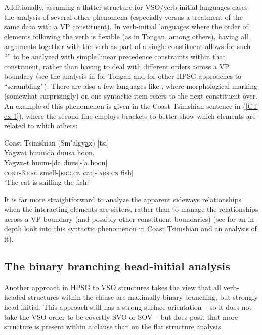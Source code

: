 \documentclass[output=paper
                ,modfonts
                ,nonflat
	        ,collection
	        ,collectionchapter
	        ,collectiontoclongg
 	        ,biblatex
                ,babelshorthands
                ,newtxmath
                ,draftmode
                ,colorlinks, citecolor=brown
]{./langsci/langscibook}
\begin{document}
{Additionally, assuming a flatter structure for VSO/verb-initial languages eases the analysis of several other phenomena (especially versus a treatment of the same data with a VP constituent). In verb-initial languages where the order of elements following the verb is flexible (as in Tongan, among others), having all arguments together with the verb as part of a single constituent allows for such ``'' to be analyzed with simple linear precedence constraints within that constituent, rather than having to deal with different orders across a VP boundary (see the analysis in \citealt[Chapter 3]{ball08thesis} for Tongan and  for other HPSG approaches to ``scrambling''). There are also a few languages like , where morphological marking (somewhat surprisingly) on one syntactic item refers to the next constituent over. An example of this phenomenon is given in the Coast Tsimshian sentence in (\ref{CT ex 1}), where the second line employs brackets to better show which elements are related to which others:        
%
\begin{samepage}
\begin{exe}
\ex\label{CT ex 1} Coast Tsimshian (Sm'algy\underline{a}x) [tsi] \citep[32]{mulder94} \\
 Yagwat huumda duusa hoon. \\
\gll Yagwa-t huum-[da duus]-[a hoon] \\
 \textsc{cont}-\textsc{3.erg} smell-[\textsc{erg.cn} cat]-[\textsc{abs.cn} fish] \\
\trans `The cat is sniffing the fish.' 
\end{exe}
\end{samepage}
%
It is far more straightforward to analyze the apparent sideways relationships when the interacting elements are sisters, rather than to manage the relationships across a VP boundary (and possibly other constituent boundaries) (see \citealt{ball11} for an in-depth look into this syntactic phenomenon in Coast Tsimshian and an analysis of it).  

\subsection{The binary branching head-initial analysis} 

Another approach in HPSG to VSO structures takes the view that all verb-headed structures within the clause are maximally binary branching, but strongly head-initial. This approach still has a strong surface-orientation -- so it does not take the VSO order to be covertly SVO or SOV -- but does posit that more structure is present within a clause than on the flat structure analysis. 

}
\end{document}

